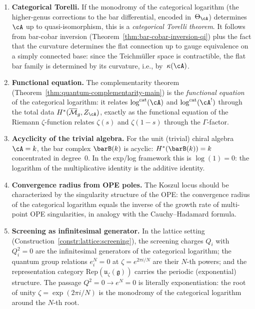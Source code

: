 \begin{enumerate}[label=(\arabic*)]
\item \textbf{Categorical Torelli.}  If the monodromy of the
categorical logarithm (the higher-genus corrections to the bar
differential, encoded in~$\Theta_\cA$) determines~$\cA$ up to
quasi-isomorphism, this is a \emph{categorical Torelli theorem}.  It
follows from bar-cobar inversion (Theorem~\ref{thm:bar-cobar-inversion-qi})
plus the fact that the curvature determines the flat connection up to
gauge equivalence on a simply connected base: since the Teichm\"uller
space is contractible, the flat bar family is determined by its
curvature, i.e., by~$\kappa(\cA)$.

\item \textbf{Functional equation.}  The complementarity theorem
(Theorem~\ref{thm:quantum-complementarity-main}) is the \emph{functional equation} of the categorical
logarithm: it relates $\log^{\mathrm{cat}}(\cA)$ and
$\log^{\mathrm{cat}}(\cA^!)$ through the total data
$H^*(\overline{\mathcal{M}}_g, Z_\cA)$, exactly as the functional
equation of the Riemann $\zeta$-function relates $\zeta(s)$ and
$\zeta(1-s)$ through the $\Gamma$-factor.

\item \textbf{Acyclicity of the trivial algebra.}  For the unit
(trivial) chiral algebra $\cA = k$, the bar complex $\barB(k)$ is
acyclic: $H^*(\barB(k)) = k$ concentrated in degree~$0$.  In the
exp/log framework this is $\log(1) = 0$: the logarithm of the
multiplicative identity is the additive identity.

\item \textbf{Convergence radius from OPE poles.}  The Koszul locus
should be characterized by the singularity structure of the OPE: the
convergence radius of the categorical logarithm equals the inverse of
the growth rate of multi-point OPE singularities, in analogy with the
Cauchy--Hadamard formula.

\item \textbf{Screening as infinitesimal generator.}  In the lattice
setting (Construction~\ref{constr:lattice:screening}), the screening charges $Q_i$
with $Q_i^2 = 0$ are the infinitesimal generators of the categorical
logarithm; the quantum group relations $e_i^N = 0$ at $\zeta =
e^{2\pi i/N}$ are their $N$-th powers; and the representation category
$\mathrm{Rep}(\mathfrak{u}_\zeta(\mathfrak{g}))$ carries the periodic
(exponential) structure.  The passage $Q^2 = 0 \to e^N = 0$ is
literally exponentiation: the root of unity
$\zeta = \exp(2\pi i/N)$ is the monodromy of the categorical
logarithm around the $N$-th root.
\end{enumerate}


